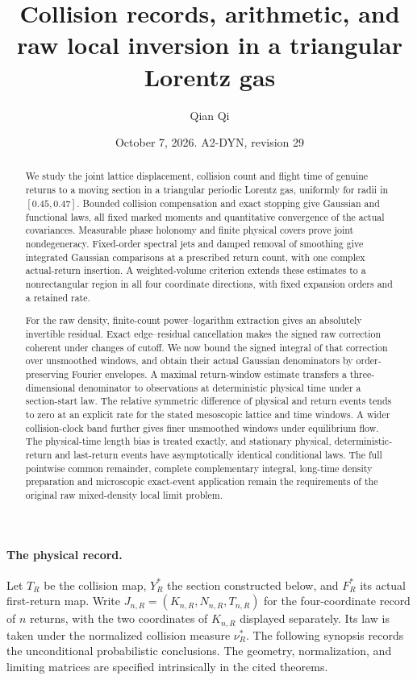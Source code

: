 \documentclass[11pt,reqno]{amsart}
\title[Collision records and raw local inversion]{Collision records, arithmetic, and raw local inversion in a triangular Lorentz gas}
\author{Qian Qi}
\date{October 7, 2026. A2-DYN, revision 29}
\numberwithin{equation}{section}
\theoremstyle{definition}\newtheorem{definition}[theorem]{Definition}
\theoremstyle{remark}\newtheorem{remark}[theorem]{Remark}
\begin{document}
\raggedbottom
\begin{abstract}
We study the joint lattice displacement, collision count and flight time
of genuine returns to a moving section in a triangular periodic Lorentz
gas, uniformly for radii in $[0.45,0.47]$. Bounded collision compensation
and exact stopping give Gaussian and functional laws, all fixed marked
moments and quantitative convergence of the actual covariances.
Measurable phase holonomy and finite physical covers prove joint
nondegeneracy. Fixed-order spectral jets and damped removal of smoothing
give integrated Gaussian comparisons at a prescribed return count,
with one complex actual-return insertion. A weighted-volume criterion
extends these estimates to a nonrectangular region in all four
coordinate directions, with fixed expansion orders and a retained rate.

For the raw density, finite-count power--logarithm extraction gives an
absolutely invertible residual. Exact edge--residual cancellation makes
the signed raw correction coherent under changes of cutoff. We now
bound the signed integral of that correction over unsmoothed windows,
and obtain their actual Gaussian denominators by order-preserving
Fourier envelopes. A maximal return-window estimate transfers a
three-dimensional denominator to observations at deterministic physical
time under a section-start law. The relative symmetric difference of
physical and return events tends to zero at an explicit rate for the
stated mesoscopic lattice and time windows. A wider collision-clock
band further gives finer unsmoothed windows under equilibrium flow.
The physical-time length bias is treated exactly, and stationary
physical, deterministic-return and last-return events have asymptotically
identical conditional laws. The full pointwise common
remainder, complete complementary integral, long-time density preparation
and microscopic exact-event application remain the requirements of the
original raw mixed-density local limit problem.
\end{abstract}
\maketitle

\paragraph{The physical record.}
Let $T_R$ be the collision map, $Y_R^*$ the section constructed below,
and $F_R^*$ its actual first-return map. Write
$J_{n,R}=(K_{n,R},N_{n,R},T_{n,R})$ for the four-coordinate record of
$n$ returns, with the two coordinates of $K_{n,R}$ displayed separately.
Its law is taken under the normalized collision measure $\nu_R^*$.
The following synopsis records the unconditional probabilistic
conclusions. The geometry, normalization, and limiting matrices are
specified intrinsically in the cited theorems.
\end{document}
